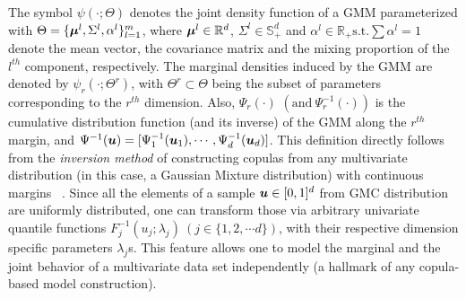 \documentclass{article}
\theoremstyle{plain}
\theoremstyle{definition}
\theoremstyle{remark}
\begin{document}
The symbol $\psi(\cdot;\Theta)$ denotes the joint density function of a GMM parameterized with $\Theta = \{\boldsymbol{\mu}^l, \Sigma^l, \alpha^l\}_{l=1}^m$, where $\boldsymbol{\mu}^l \in \mathbb{R}^d$, $\Sigma^l \in \mathbb{S}_+^d$ and $\alpha^l \in \mathbb{R}_+ \text{s.t.} \sum \alpha^l=1$ denote the mean vector, the covariance matrix and the mixing proportion of the $l^{th}$ component, respectively. The marginal densities induced by the GMM are denoted by $\psi_r(\cdot;\Theta^r)$, with $\Theta^r\subset \Theta$ being the subset of parameters corresponding to the $r^{th}$ dimension. Also, $\Psi_r(\cdot)$ $\left(\text{and} \ \Psi^{-1}_r(\cdot) \right)$ is the cumulative distribution function (and its inverse) of the GMM along the $r^{th}$ margin, and $\Psi^{-1}(\boldsymbol{u})=[\Psi^{-1}_1(\boldsymbol{u}_1), \cdots, \Psi^{-1}_d(\boldsymbol{u}_d)]$. This definition directly follows from the \emph{inversion method} of constructing copulas from any multivariate distribution (in this case, a Gaussian Mixture distribution) with continuous margins ~\citep[see][chapter 3]{Nelsen1999Chapter3}. Since all the elements of a sample $\boldsymbol{u}\in [0,1]^d$ from GMC distribution are uniformly distributed, one can transform those via arbitrary univariate quantile functions $F_j^{-1}(u_j;\lambda_j) \ (j\in \{1,2,\cdots d\} )$, with their respective dimension specific parameters $\lambda_j$s. This feature allows one to model the marginal and the joint behavior of a multivariate data set independently (a hallmark of any copula-based model construction).
\end{document}
